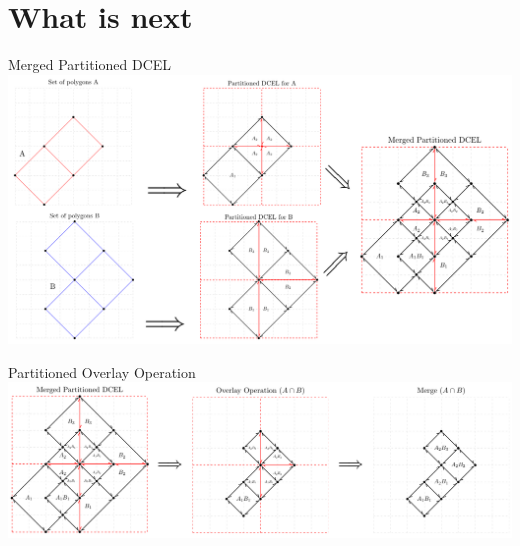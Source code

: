 \documentclass{beamer}
\begin{document}
\section{What is next}
\begin{frame}{Merged Partitioned DCEL}
    \centering 
    \includegraphics[width=\linewidth]{figures/OverlayParted} 
\end{frame}

\begin{frame}{Partitioned Overlay Operation}
    \centering 
    \includegraphics[width=\linewidth]{figures/OverlayParted2} 
\end{frame}
\end{document}

